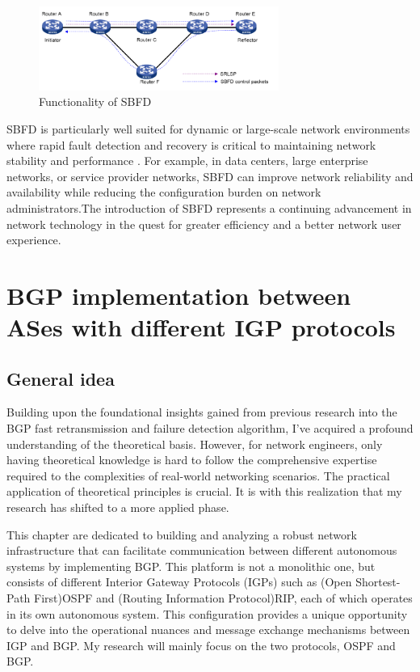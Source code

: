 \documentclass[12pt]{article}
\begin{document}
\begin{figure}[h]
    \centering
    \includegraphics[width=0.7\textwidth]{Graph/SBFD.png}
    \caption{Functionality of SBFD \cite{ref7}} 
    \label{fig:Functionality of SBFD} 
    
\end{figure}

SBFD is particularly well suited for dynamic or large-scale network environments where rapid fault detection and recovery is critical to maintaining network stability and performance \cite{ref11}. For example, in data centers, large enterprise networks, or service provider networks, SBFD can improve network reliability and availability while reducing the configuration burden on network administrators.The introduction of SBFD represents a continuing advancement in network technology in the quest for greater efficiency and a better network user experience.

\newpage
\section{BGP implementation between ASes with different IGP protocols}
\subsection{General idea}
Building upon the foundational insights gained from previous research into the BGP fast retransmission and failure detection algorithm, I've acquired a profound understanding of the theoretical basis. However, for network engineers, only having theoretical knowledge is hard to follow the comprehensive expertise required to the complexities of real-world networking scenarios. The practical application of theoretical principles is crucial. It is with this realization that my research has shifted to a more applied phase.

This chapter are dedicated to building and analyzing a robust network infrastructure that can facilitate communication between different autonomous systems by implementing BGP. This platform is not a monolithic one, but consists of different Interior Gateway Protocols (IGPs) such as (Open Shortest-Path First)OSPF and (Routing Information Protocol)RIP, each of which operates in its own autonomous system. This configuration provides a unique opportunity to delve into the operational nuances and message exchange mechanisms between IGP and BGP. My research will mainly focus on the two protocols, OSPF and BGP.
\end{document}
